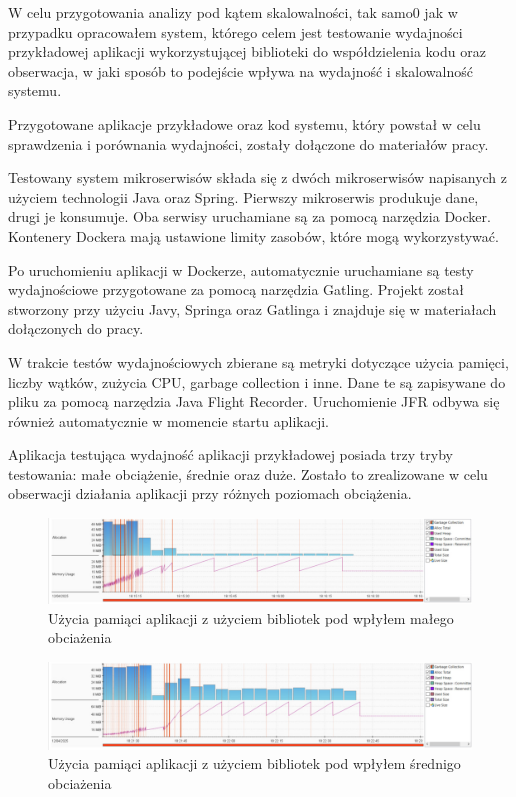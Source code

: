 \documentclass[runningheads,12pt]{llncs}
\begin{document}
W celu przygotowania analizy pod kątem skalowalności, tak samo0 jak w przypadku opracowałem system, którego celem jest testowanie wydajności przykładowej aplikacji wykorzystującej biblioteki do współdzielenia kodu oraz obserwacja, w jaki sposób to podejście wpływa na wydajność i skalowalność systemu.

Przygotowane aplikacje przykładowe oraz kod systemu, który powstał w celu sprawdzenia i porównania wydajności, zostały dołączone do materiałów pracy.

Testowany system mikroserwisów składa się z dwóch mikroserwisów napisanych z użyciem technologii Java oraz Spring. Pierwszy mikroserwis produkuje dane, drugi je konsumuje. Oba serwisy uruchamiane są za pomocą narzędzia Docker. Kontenery Dockera mają ustawione limity zasobów, które mogą wykorzystywać.

Po uruchomieniu aplikacji w Dockerze, automatycznie uruchamiane są testy wydajnościowe przygotowane za pomocą narzędzia Gatling. Projekt został stworzony przy użyciu Javy, Springa oraz Gatlinga i znajduje się w materiałach dołączonych do pracy.

W trakcie testów wydajnościowych zbierane są metryki dotyczące użycia pamięci, liczby wątków, zużycia CPU, garbage collection i inne. Dane te są zapisywane do pliku za pomocą narzędzia Java Flight Recorder. Uruchomienie JFR odbywa się również automatycznie w momencie startu aplikacji.

Aplikacja testująca wydajność aplikacji przykładowej posiada trzy tryby testowania: małe obciążenie, średnie oraz duże. Zostało to zrealizowane w celu obserwacji działania aplikacji przy różnych poziomach obciążenia.

\begin{figure}
    \includegraphics[width=\linewidth]{images/sdk-memory-low-graph.jpg}
    \caption{Użycia pamiąci aplikacji z użyciem bibliotek pod wpłyłem małego obciażenia} \label{fig1}
\end{figure}

\begin{figure}
    \includegraphics[width=\linewidth]{images/sdk-memory-middle-graph.jpg}
    \caption{Użycia pamiąci aplikacji z użyciem bibliotek pod wpłyłem średnigo obciażenia} \label{fig1}
\end{figure}
\end{document}
